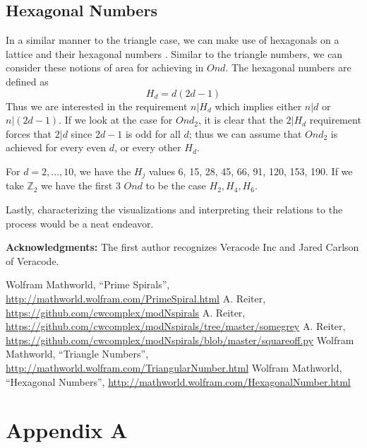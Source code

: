 \documentclass[11pt,reqno]{amsart}
\theoremstyle{mydef}
\begin{document}
\subsection{Hexagonal Numbers}

In a similar manner to the triangle case, we can make use of hexagonals on a lattice and 
their hexagonal numbers  \cite{HexagonalNumbers}. Similar to the triangle numbers, we
can consider these notions of area for achieving in $Ond$. The hexagonal numbers are
defined as 
\[
	H_d = d(2d - 1)
\]
Thus we are interested in the requirement $n \vert H_d$ which implies either $n \vert d$ or
$n \vert (2d - 1)$.  If we look at the case for $Ond_2$, it is clear that the $2 \vert H_d$ requirement
forces that $2 \vert d$ since $2d -1$ is odd for all $d$; thus we can assume that $Ond_2$ is
achieved for every even $d$, or every other $H_d$.

For $d = 2, \ldots, 10$, we
have the $H_j$ values 6, 15, 28, 45, 66, 91, 120, 153, 190. If we take $\mathbb{Z}_2$ we have the first 3 $Ond$
to be the case $H_2, H_4, H_6$.

Lastly, characterizing the visualizations and interpreting their
relations to the process would be a neat endeavor.


\vspace{12pt}\noindent\textbf{Acknowledgments:}\quad
The first author recognizes Veracode Inc and Jared Carlson of Veracode.

\begin{thebibliography}{1}
 Wolfram Mathworld, ``Prime Spirals'',
  \url{http://mathworld.wolfram.com/PrimeSpiral.html}
 A. Reiter,
  \url{https://github.com/cwcomplex/modNspirals}
 A. Reiter,
  \url{https://github.com/cwcomplex/modNspirals/tree/master/somegrey}
 A. Reiter,
  \url{https://github.com/cwcomplex/modNspirals/blob/master/squareoff.py}
 Wolfram Mathworld, ``Triangle Numbers'',
  \url{http://mathworld.wolfram.com/TriangularNumber.html}
 Wolfram Mathworld, ``Hexagonal Numbers'',
  \url{http://mathworld.wolfram.com/HexagonalNumber.html}
\end{thebibliography}



\clearpage
\section{Appendix A}
\end{document}
